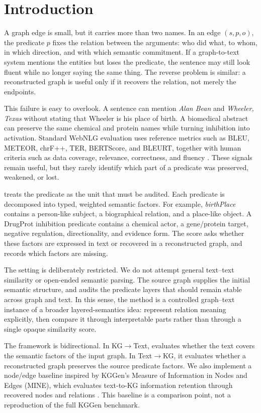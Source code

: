 
\section{Introduction}
A graph edge is small, but it carries more than two names. In an edge \((s,p,o)\), the predicate \(p\) fixes the relation between the arguments: who did what, to whom, in which direction, and with which semantic commitment. If a graph-to-text system mentions the entities but loses the predicate, the sentence may still look fluent while no longer saying the same thing. The reverse problem is similar: a reconstructed graph is useful only if it recovers the relation, not merely the endpoints.

This failure is easy to overlook. A sentence can mention \textit{Alan Bean} and \textit{Wheeler, Texas} without stating that Wheeler is his place of birth. A biomedical abstract can preserve the same chemical and protein names while turning inhibition into activation. Standard WebNLG evaluation uses reference metrics such as BLEU, METEOR, chrF++, TER, BERTScore, and BLEURT, together with human criteria such as data coverage, relevance, correctness, and fluency \cite{gardent2017webnlg,castroferreira2020webnlg,gehrmann2021gem}. These signals remain useful, but they rarely identify which part of a predicate was preserved, weakened, or lost.

\lemonscore{} treats the predicate as the unit that must be audited. Each predicate is decomposed into typed, weighted semantic factors. For example, \textit{birthPlace} contains a person-like subject, a biographical relation, and a place-like object. A DrugProt inhibition predicate contains a chemical actor, a gene/protein target, negative regulation, directionality, and evidence form. The score asks whether these factors are expressed in text or recovered in a reconstructed graph, and records which factors are missing.

The setting is deliberately restricted. We do not attempt general text--text similarity or open-ended semantic parsing. The source graph supplies the initial semantic structure, and \lemonscore{} audits the predicate layers that should remain stable across graph and text. In this sense, the method is a controlled graph--text instance of a broader layered-semantics idea: represent relation meaning explicitly, then compare it through interpretable parts rather than through a single opaque similarity score.

The framework is bidirectional. In KG$\rightarrow$Text, \lemonscore{} evaluates whether the text covers the semantic factors of the input graph. In Text$\rightarrow$KG, it evaluates whether a reconstructed graph preserves the source predicate factors. We also implement a \minebase{} node/edge baseline inspired by KGGen's Measure of Information in Nodes and Edges (MINE), which evaluates text-to-KG information retention through recovered nodes and relations \cite{mo2025kggen}. This baseline is a comparison point, not a reproduction of the full KGGen benchmark.

